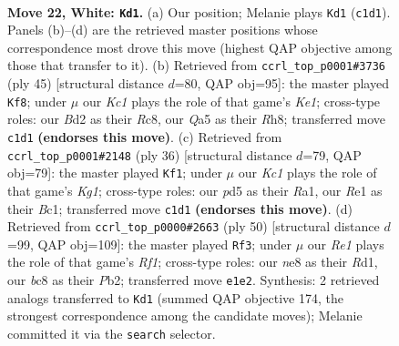 \documentclass[11pt]{article}
\begin{document}
\clearpage

\begin{figure}[p]\centering
\begin{subfigure}{0.46\textwidth}\centering
\resizebox{\linewidth}{!}{%
\newchessgame
\chessboard[
  setfen={r1brn1k1/p1p1qp2/6p1/Q1PpP2p/3N4/1P2P1P1/p2B1P1P/2K1RBR1 w - - 1 22},
  showmover=false,
  pgfstyle=straightmove, color=movearrow, markmove={c1-d1}
]}
\caption{}
\end{subfigure}\hfill
\begin{subfigure}{0.46\textwidth}\centering
\resizebox{\linewidth}{!}{%
\newchessgame
\chessboard[
  setfen={2r1k2r/2qb1pp1/4p3/pp1nP1pP/2pP2Q1/P7/1P3PPN/RB2R1K1 b k - 1 23},
  showmover=false,
  pgfstyle=straightmove, color=movearrow, markmove={e8-f8}
]}
\caption{}
\end{subfigure}
\\[4pt]
\begin{subfigure}{0.46\textwidth}\centering
\resizebox{\linewidth}{!}{%
\newchessgame
\chessboard[
  setfen={r3k2r/ppb2pp1/2pqp1n1/8/P2PQ2p/2PB3P/1P3PP1/R1B1R1K1 w kq - 1 19},
  showmover=false,
  pgfstyle=straightmove, color=movearrow, markmove={g1-f1}
]}
\caption{}
\end{subfigure}\hfill
\begin{subfigure}{0.46\textwidth}\centering
\resizebox{\linewidth}{!}{%
\newchessgame
\chessboard[
  setfen={4r1k1/3q1p2/pr3bpp/3p4/1npP1PP1/2N1P2Q/1P4BP/3R1R1K w - - 2 26},
  showmover=false,
  pgfstyle=straightmove, color=movearrow, markmove={f1-f3}
]}
\caption{}
\end{subfigure}
\caption{\textbf{Move 22, White: \texttt{Kd1}.} (a) Our position; Melanie plays \texttt{Kd1} (\texttt{c1d1}). Panels (b)--(d) are the retrieved master positions whose correspondence most drove this move (highest QAP objective among those that transfer to it). (b) Retrieved from \texttt{ccrl\_top\_p0001\#3736} (ply 45) [structural distance $d$=80, QAP obj=95]: the master played \texttt{Kf8}; under $\mu$ our \emph{Kc1} plays the role of that game's \emph{Ke1}; cross-type roles: our \emph{B}d2 as their \emph{R}c8, our \emph{Q}a5 as their \emph{R}h8; transferred move \texttt{c1d1} \textbf{(endorses this move)}. (c) Retrieved from \texttt{ccrl\_top\_p0001\#2148} (ply 36) [structural distance $d$=79, QAP obj=79]: the master played \texttt{Kf1}; under $\mu$ our \emph{Kc1} plays the role of that game's \emph{Kg1}; cross-type roles: our \emph{p}d5 as their \emph{R}a1, our \emph{R}e1 as their \emph{B}c1; transferred move \texttt{c1d1} \textbf{(endorses this move)}. (d) Retrieved from \texttt{ccrl\_top\_p0000\#2663} (ply 50) [structural distance $d$=99, QAP obj=109]: the master played \texttt{Rf3}; under $\mu$ our \emph{Re1} plays the role of that game's \emph{Rf1}; cross-type roles: our \emph{n}e8 as their \emph{R}d1, our \emph{b}c8 as their \emph{P}b2; transferred move \texttt{e1e2}. Synthesis: 2 retrieved analogs transferred to \texttt{Kd1} (summed QAP objective 174, the strongest correspondence among the candidate moves); Melanie committed it via the \texttt{search} selector.}
\label{fig:thought-m42}
\end{figure}
\end{document}
